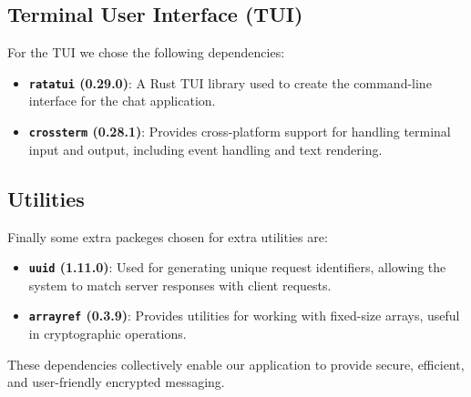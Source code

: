 \subsection{Terminal User Interface (TUI)}  
\label{subsed:TerminalUserInterfaceTUI}

For the TUI we chose the following dependencies:

\begin{itemize}
  \item \textbf{\texttt{ratatui} (0.29.0)}: A Rust TUI library used to create the command-line interface for the chat application.
  \item \textbf{\texttt{crossterm} (0.28.1)}: Provides cross-platform support for handling terminal input and output, including event handling and text rendering.
\end{itemize}

\subsection{Utilities}
\label{subsec:Utilities}

Finally some extra packeges chosen for extra utilities are:

\begin{itemize}
  \item \textbf{\texttt{uuid} (1.11.0)}: Used for generating unique request identifiers, allowing the system to match server responses with client requests.
  \item \textbf{\texttt{arrayref} (0.3.9)}: Provides utilities for working with fixed-size arrays, useful in cryptographic operations.
\end{itemize}

These dependencies collectively enable our application to provide secure, efficient, and user-friendly encrypted messaging.  
